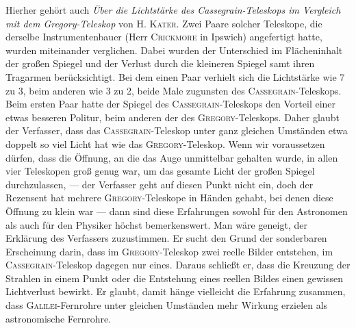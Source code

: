 Hierher gehört auch \emph{Über die Lichtstärke des Cassegrain-Teleskops im Vergleich mit dem Gregory-Teleskop} von H. \textsc{Kater}. Zwei Paare solcher Teleskope, die derselbe Instrumentenbauer (Herr \textsc{Crickmore} in Ipswich) angefertigt hatte, wurden miteinander verglichen. Dabei wurden der Unterschied im Flächeninhalt der großen Spiegel und der Verlust durch die kleineren Spiegel samt ihren Tragarmen berücksichtigt. Bei dem einen Paar verhielt sich die Lichtstärke wie 7 zu 3, beim anderen wie 3 zu 2, beide Male zugunsten des \textsc{Cassegrain}-Teleskops. Beim ersten Paar hatte der Spiegel des \textsc{Cassegrain}-Teleskops den Vorteil einer etwas besseren Politur, beim anderen der des \textsc{Gregory}-Teleskops. Daher glaubt der Verfasser, dass das \textsc{Cassegrain}-Teleskop unter ganz gleichen Umständen etwa doppelt so viel Licht hat wie das \textsc{Gregory}-Teleskop. Wenn wir voraussetzen dürfen, dass die Öffnung, an die das Auge unmittelbar gehalten wurde, in allen vier Teleskopen groß genug war, um das gesamte Licht der großen Spiegel durchzulassen, — der Verfasser geht auf diesen Punkt nicht ein, doch der Rezensent hat mehrere \textsc{Gregory}-Teleskope in Händen gehabt, bei denen diese Öffnung zu klein war — dann sind diese Erfahrungen sowohl für den Astronomen als auch für den Physiker höchst bemerkenswert. Man wäre geneigt, der Erklärung des Verfassers zuzustimmen. Er sucht den Grund der sonderbaren Erscheinung darin, dass im \textsc{Gregory}-Teleskop zwei reelle Bilder entstehen, im \textsc{Cassegrain}-Teleskop dagegen nur eines. Daraus schließt er, dass die Kreuzung der Strahlen in einem Punkt oder die Entstehung eines reellen Bildes einen gewissen Lichtverlust bewirkt. Er glaubt, damit hänge vielleicht die Erfahrung zusammen, dass \textsc{Galilei}-Fernrohre unter gleichen Umständen mehr Wirkung erzielen als astronomische Fernrohre.
